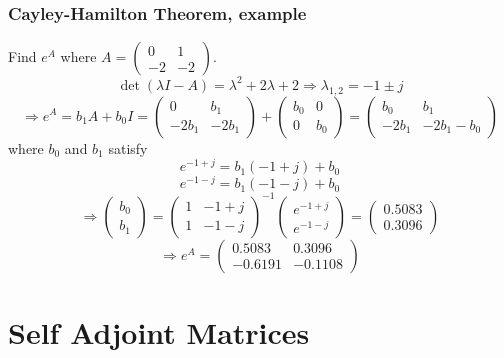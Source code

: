\documentclass{beamer}
\begin{document}
\begin{frame}\frametitle{Cayley-Hamilton Theorem, example}
	Find $e^A$ where 
	$A = \begin{pmatrix}
	    	0 & 1\\
	    	-2 & -2
	  	  \end{pmatrix}$.  
	{\footnotesize
	\[ \det(\lambda I - A ) = \lambda^2 + 2\lambda + 2 \Rightarrow
	\lambda_{1,2} = -1 \pm j \]
	\[ \Rightarrow e^A = b_1A + b_0I = \begin{pmatrix}
	    0 & b_1\\
	    -2b_1 & -2b_1
	  \end{pmatrix}+\begin{pmatrix}
	    b_0 & 0\\
	    0 & b_0
	  \end{pmatrix} = \begin{pmatrix}
	    b_0 & b_1\\
	    -2b_1 & -2b_1-b_0
	  \end{pmatrix}\]
	}
	where $b_0$ and $b_1$ satisfy
	\[e^{-1+j} = b_1(-1+j) + b_0\]
	\[e^{-1-j} = b_1(-1-j)+b_0 \]
	\[ \Rightarrow \begin{pmatrix}
	    b_0\\b_1
	  \end{pmatrix}
	= \begin{pmatrix}
	    1 & -1+j\\
	    1 & -1-j
	  \end{pmatrix}^{-1}\begin{pmatrix}
	    e^{-1+j}\\e^{-1-j}
	  \end{pmatrix}=\begin{pmatrix}
	    0.5083\\
	    0.3096
	  \end{pmatrix}
	\]
	\[\Rightarrow e^{A} = \begin{pmatrix}
	    0.5083 & 0.3096\\
	    -0.6191 & -0.1108
	  \end{pmatrix}
	 \]
\end{frame}


\section{Self Adjoint Matrices}
\frame{\sectionpage}
\end{document}
